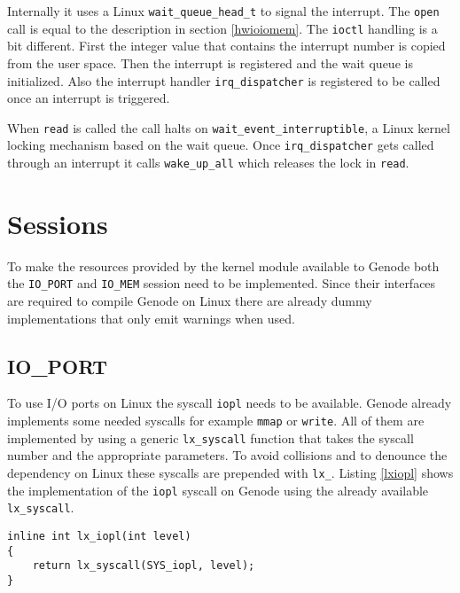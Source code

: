 \documentclass[
a4paper,
12pt,
notitlepage,
parskip=half,
DIV=11,
]{scrbook}
\begin{document}
		Internally it uses a Linux \texttt{wait\_queue\_head\_t} to signal the interrupt.
		The \texttt{open} call is equal to the description in section \ref{hwioiomem}.
		The \texttt{ioctl} handling is a bit different.
		First the integer value that contains the interrupt number is copied from the user space.
		Then the interrupt is registered and the wait queue is initialized.
		Also the interrupt handler \texttt{irq\_dispatcher} is registered to be called once an interrupt is triggered.
		
		When \texttt{read} is called the call halts on \texttt{wait\_event\_interruptible}, a Linux kernel locking mechanism based on the wait queue.
		Once \texttt{irq\_dispatcher} gets called through an interrupt it calls \texttt{wake\_up\_all} which releases the lock in \texttt{read}.
		
		\section{Sessions}
		
		To make the resources provided by the kernel module available to Genode both the \texttt{IO\_PORT} and \texttt{IO\_MEM} session need to be implemented.
		Since their interfaces are required to compile Genode on Linux there are already dummy implementations that only emit warnings when used.
		
		\subsection{IO\_PORT}
		
		To use I/O ports on Linux the syscall \texttt{iopl} \citep{iopl} needs to be available.
		Genode already implements some needed syscalls for example \texttt{mmap} or \texttt{write}.
		All of them are implemented by using a generic \texttt{lx\_syscall} function that takes the syscall number and the appropriate parameters.
		To avoid collisions and to denounce the dependency on Linux these syscalls are prepended with \texttt{lx\_}.
		Listing \ref{lxiopl} shows the implementation of the \texttt{iopl} syscall on Genode using the already available \texttt{lx\_syscall}.
		
		\begin{lstlisting}[basicstyle=\ttfamily\footnotesize]
inline int lx_iopl(int level)
{
	return lx_syscall(SYS_iopl, level);
}
		\end{lstlisting}
		
\end{document}
